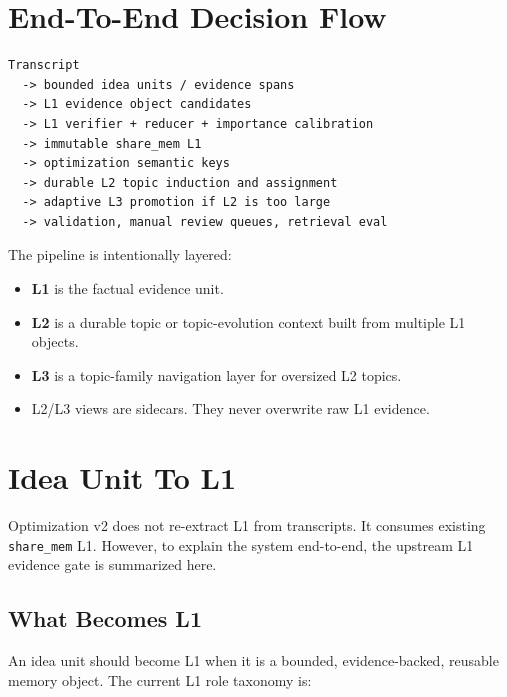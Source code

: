 \documentclass[11pt,a4paper]{article}
\newcommand{\code}[1]{{\footnotesize\texttt{#1}}}
\begin{document}
\section{End-To-End Decision Flow}

\begin{verbatim}
Transcript
  -> bounded idea units / evidence spans
  -> L1 evidence object candidates
  -> L1 verifier + reducer + importance calibration
  -> immutable share_mem L1
  -> optimization semantic keys
  -> durable L2 topic induction and assignment
  -> adaptive L3 promotion if L2 is too large
  -> validation, manual review queues, retrieval eval
\end{verbatim}

The pipeline is intentionally layered:

\begin{itemize}
  \item \textbf{L1} is the factual evidence unit.
  \item \textbf{L2} is a durable topic or topic-evolution context built from multiple L1 objects.
  \item \textbf{L3} is a topic-family navigation layer for oversized L2 topics.
  \item L2/L3 views are sidecars. They never overwrite raw L1 evidence.
\end{itemize}

\section{Idea Unit To L1}

Optimization v2 does not re-extract L1 from transcripts. It consumes existing \code{share\_mem} L1. However, to explain the system end-to-end, the upstream L1 evidence gate is summarized here.

\subsection{What Becomes L1}

An idea unit should become L1 when it is a bounded, evidence-backed, reusable memory object. The current L1 role taxonomy is:
\end{document}
